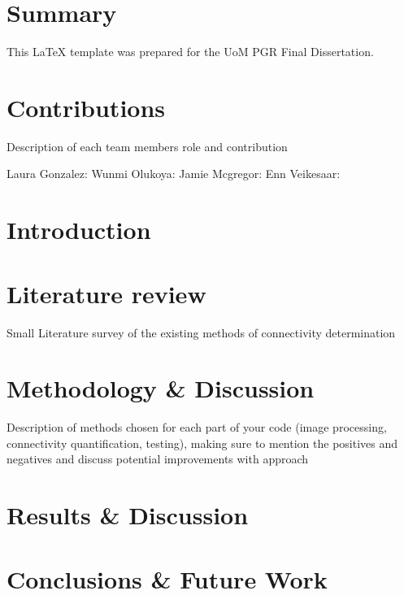 \documentclass[12pt]{article}
\begin{document}
\section*{Summary}
     This LaTeX template was prepared for the UoM PGR Final Dissertation.
     
\newpage
\begin{singlespacing}
\tableofcontents
\end{singlespacing}
\setlength{\parskip}{1em}
\renewcommand{\baselinestretch}{2.0}

\newpage 
{}
\setcounter{page}{1}
\onehalfspacing

\section{Contributions}

Description of each team members role and contribution

Laura Gonzalez:
Wunmi Olukoya:
Jamie Mcgregor: 
Enn Veikesaar:




\section{Introduction}

\cite{SUNIL2020152457}
\cite{SHARMA2018546}
\cite{SIMON2021152817}


\section{Literature review}

Small Literature survey of the existing methods of connectivity determination


\section{Methodology \& Discussion}

Description of methods chosen for each part of your code (image processing, connectivity quantification, testing), making sure to mention the positives and negatives and discuss potential improvements with approach

\section{Results \& Discussion}


\section{Conclusions \& Future Work}




\newpage
\singlespacing


\end{document}
